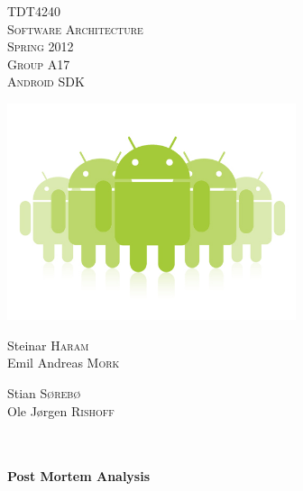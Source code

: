 \begin{titlepage}

\begin{center}

\textsc{\Large TDT4240}\\[1.0cm]

\textsc{\LARGE Software Architecture}\\[1.0cm]

\textsc{\Large Spring 2012}\\[1.0cm]

\textsc{Group A17} \\
\textsc{Android SDK}

\includegraphics[width=240pt]{Images/androids}\\[0.5cm]   

\begin{minipage}{0.4\textwidth}
\begin{flushleft} \large

Steinar \textsc{Haram}\\
Emil Andreas \textsc{Mork}\\

\end{flushleft}
\end{minipage}
\begin{minipage}{0.4\textwidth}
\begin{flushright} \large

Stian \textsc{Sørebø}\\
Ole Jørgen \textsc{Rishoff}

\end{flushright}
\end{minipage}\\[1.0cm]

\HRule \\[0.4cm]
{ \huge \bfseries Post Mortem Analysis}\\[0.4cm]
\HRule \\[1.5cm]


\end{center}
\end{titlepage}
